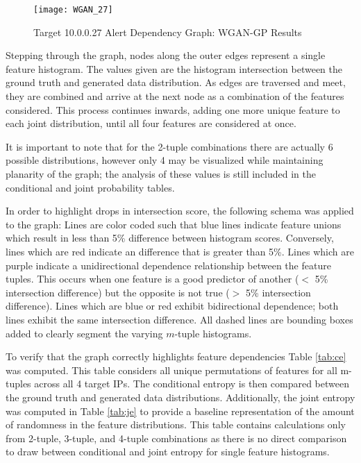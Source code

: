 \begin{figure}[!htbp]
	\centering
	\texttt{[image: WGAN\_27]}
	\caption{
		Target 10.0.0.27 Alert Dependency Graph: WGAN-GP Results
	}
	\label{fig:alert_depend_1}
\end{figure}

Stepping through the graph, nodes along the outer edges represent a single feature histogram. The values given are the histogram intersection between the ground truth and generated data distribution. As edges are traversed and meet, they are combined and arrive at the next node as a combination of the features considered. This process continues inwards, adding one more unique feature to each joint distribution, until all four features are considered at once.

It is important to note that for the 2-tuple combinations there are actually 6 possible distributions, however only 4 may be visualized while maintaining planarity of the graph; the analysis of these values is still included in the conditional and joint probability tables.

In order to highlight drops in intersection score, the following schema was applied to the graph: Lines are color coded such that blue lines indicate feature unions which result in less than 5\% difference between histogram scores. Conversely, lines which are red indicate an difference that is greater than 5\%. Lines which are purple indicate a unidirectional dependence relationship between the feature tuples. This occurs when one feature is a good predictor of another ($<$ 5\% intersection difference) but the opposite is not true ($>$ 5\% intersection difference). Lines which are blue or red exhibit bidirectional dependence; both lines exhibit the same intersection difference. All dashed lines are bounding boxes added to clearly segment the varying $m$-tuple histograms.

To verify that the graph correctly highlights feature dependencies Table \ref{tab:ce} was computed. This table considers all unique permutations of features for all m-tuples across all 4 target IPs. The conditional entropy is then compared between the ground truth and generated data distributions. Additionally, the joint entropy was computed in Table \ref{tab:je} to provide a baseline representation of the amount of randomness in the feature distributions. This table contains calculations only from 2-tuple, 3-tuple, and 4-tuple combinations as there is no direct comparison to draw between conditional and joint entropy for single feature histograms.


